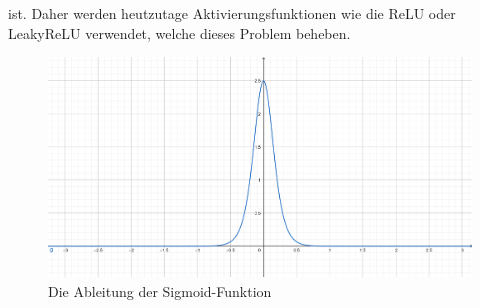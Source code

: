 ist. Daher werden heutzutage Aktivierungsfunktionen wie die \glqq ReLU\grqq{} oder \glqq LeakyReLU\grqq{} verwendet, welche
dieses Problem beheben.
\begin{figure}[h!]
    \begin{center}
        \includegraphics[width=0.6\linewidth]{../common/02_appendix/00_resources/03_sigmoide_ableitung.png}
    \end{center}
    \caption{Die Ableitung der Sigmoid-Funktion}
    \label{fig:03_sigmoide_ableitung}
\end{figure}
\newpage